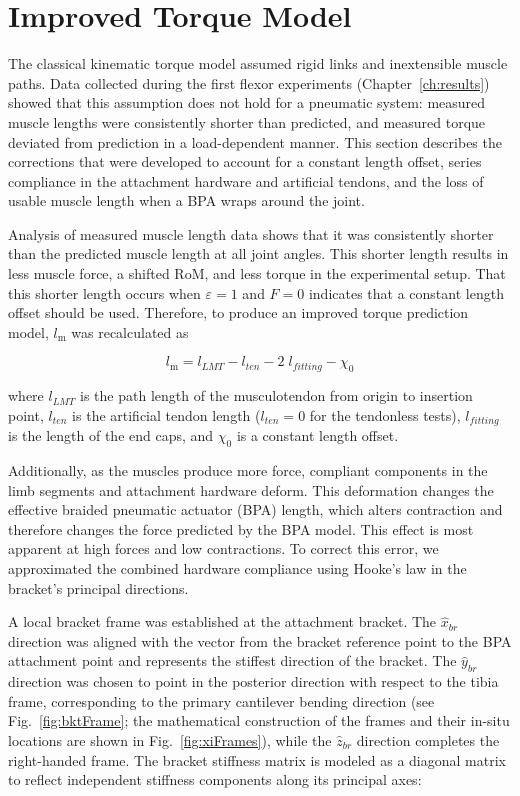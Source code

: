 \section{Improved Torque Model}\label{sec:improved_model}

The classical kinematic torque model assumed rigid links and inextensible muscle paths. Data collected during the first flexor experiments (Chapter~\ref{ch:results}) showed that this assumption does not hold for a pneumatic system: measured muscle lengths were consistently shorter than predicted, and measured torque deviated from prediction in a load-dependent manner. This section describes the corrections that were developed to account for a constant length offset, series compliance in the attachment hardware and artificial tendons, and the loss of usable muscle length when a BPA wraps around the joint.

Analysis of measured muscle length data shows that it was consistently shorter than the predicted muscle length at all joint angles. This shorter length results in less muscle force, a shifted RoM, and less torque in the experimental setup. That this shorter length occurs when $\varepsilon=1$ and $F=0$ indicates that a constant length offset should be used. Therefore, to produce an improved torque prediction model, $l_\text{m}$ was recalculated as

\begin{equation}
    l_\text{m} = l_{LMT} - l_{ten} - 2\;l_{fitting} - \chi_{0} 
    \label{eq:Lm}
\end{equation}

where $l_{LMT}$ is the path length of the musculotendon from origin to insertion point, $l_{ten}$ is the artificial tendon length ($l_{ten}=0$ for the tendonless tests), $l_{fitting}$ is the length of the end caps, and $\chi_{0}$ is a constant length offset. 

Additionally, as the muscles produce more force, compliant components in the limb segments and attachment hardware deform. This deformation changes the effective braided pneumatic actuator (BPA) length, which alters contraction and therefore changes the force predicted by the BPA model. This effect is most apparent at high forces and low contractions. To correct this error, we approximated the combined hardware compliance using Hooke's law in the bracket's principal directions.

A local bracket frame was established at the attachment bracket. The $\hat{x}_{br}$ direction was aligned with the vector from the bracket reference point to the BPA attachment point and represents the stiffest direction of the bracket. The $\hat{y}_{br}$ direction was chosen to point in the posterior direction with respect to the tibia frame, corresponding to the primary cantilever bending direction (see Fig.~\ref{fig:bktFrame}; the mathematical construction of the frames and their in-situ locations are shown in Fig.~\ref{fig:xiFrames}), while the $\hat{z}_{br}$ direction completes the right-handed frame. The bracket stiffness matrix is modeled as a diagonal matrix to reflect independent stiffness components along its principal axes:

